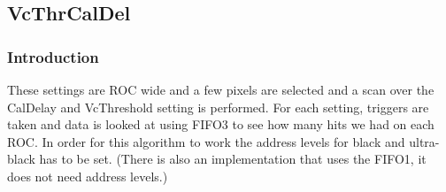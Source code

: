 





\subsection{VcThrCalDel}%
\label{sect:VcThrCalDelCalibration}

\subsubsection{Introduction}
These settings are ROC wide and a few pixels are selected and a scan over the CalDelay and VcThreshold setting is performed. For each setting, triggers are taken and data is looked at using FIFO3 to see how many hits we had on each ROC.  In order for this algorithm to work the address levels for  black and ultra-black has to be set. (There is also an implementation that uses the FIFO1, it does not need address levels.)

